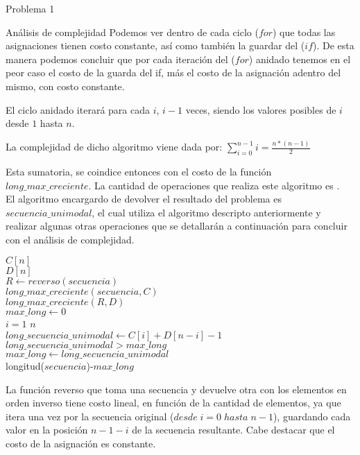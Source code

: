 \begin{section}{Problema 1}
\begin{subsection}{Análisis de complejidad}
		Podemos ver dentro de cada ciclo ($for$) que todas las asignaciones tienen costo constante, así como también la guardar 
		del ($if$). De esta manera podemos concluir que por cada iteración del ($for$) anidado tenemos en el peor caso el costo 
		de la guarda del if, más el costo de la asignación adentro del mismo, con costo constante.

		El ciclo anidado iterará para cada $i$, $i-1$ veces, siendo los valores posibles de $i$ desde $1$ hasta $n$.

		La complejidad de dicho algoritmo viene dada por: $\sum_{i=0}^{n-1} i = \frac{n*(n-1)}{2}$

		Esta sumatoria, se coindice entonces con el costo de la función $long\_max\_creciente$. La cantidad de operaciones que 
		realiza este algoritmo es .\\
	
		El algoritmo encargardo de devolver el resultado del problema es $secuencia\_unimodal$, el cual utiliza el algoritmo 
		descripto anteriormente y realizar algunas otras operaciones que se detallarán a continuación para concluir con el análisis 
		de complejidad.\\
	
		\vspace{0.5cm}
		\begin{pseudo}
			\tab $C[n]$\\
			\tab $D[n]$\\
			\tab $R \leftarrow reverso(secuencia)$ 		 \\
			\tab $long\_max\_creciente(secuencia,C)$ 	\\
			\tab $long\_max\_creciente(R,D)$		\\
			\tab $max\_long \leftarrow 0$			\\
			\tab \FOR $i=1$ \TO $n$				\\
			\tab \tab $long\_secuencia\_unimodal\leftarrow C[i]+D[n-i]-1$ 	\\
			\tab \tab \IF $ long\_secuencia\_unimodal >  max\_long$ 	\\
			\tab \tab \tab $max\_long \leftarrow long\_secuencia\_unimodal$ \\
			\tab \RET longitud($secuencia$)-$max\_long$ 			\\
		\end{pseudo}
		
		La función reverso que toma una secuencia y devuelve otra con los elementos en orden inverso tiene costo lineal, en función 
		de la cantidad de elementos, ya que itera una vez por la secuencia original ($desde\; i=0\; hasta\; n-1$), guardando cada valor en 
		la posición $n-1-i$ de la secuencia resultante. Cabe destacar que el costo de la asignación es constante.


\end{subsection}
\end{section}
